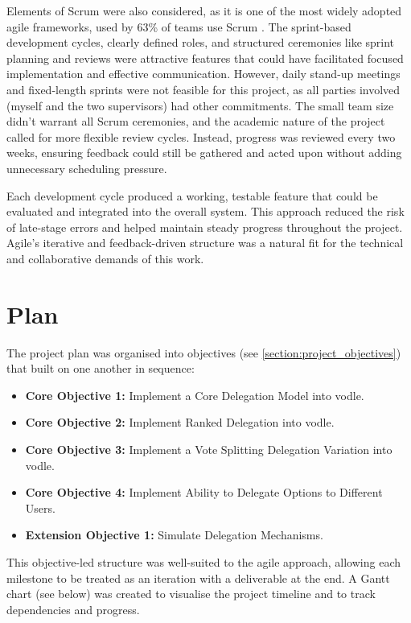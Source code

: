 Elements of Scrum were also considered, as it is one of the most widely adopted agile frameworks, used by 63\% of teams use Scrum \citep{versionone2020stateofagile}. The sprint-based development cycles, clearly defined roles, and structured ceremonies like sprint planning and reviews were attractive features that could have facilitated focused implementation and effective communication. However, daily stand-up meetings and fixed-length sprints were not feasible for this project, as all parties involved (myself and the two supervisors) had other commitments. The small team size didn't warrant all Scrum ceremonies, and the academic nature of the project called for more flexible review cycles. Instead, progress was reviewed every two weeks, ensuring feedback could still be gathered and acted upon without adding unnecessary scheduling pressure.

Each development cycle produced a working, testable feature that could be evaluated and integrated into the overall system. This approach reduced the risk of late-stage errors and helped maintain steady progress throughout the project. Agile's iterative and feedback-driven structure was a natural fit for the technical and collaborative demands of this work.
\section{Plan}

The project plan was organised into objectives (see \ref{section:project_objectives}) that built on one another in sequence:

\begin{itemize}
    \item \textbf{Core Objective 1:} Implement a Core Delegation Model into vodle.
    \item \textbf{Core Objective 2:} Implement Ranked Delegation into vodle.
    \item \textbf{Core Objective 3:} Implement a Vote Splitting Delegation Variation into vodle.
    \item \textbf{Core Objective 4:} Implement Ability to Delegate Options to Different Users.
    \item \textbf{Extension Objective 1:} Simulate Delegation Mechanisms.
\end{itemize}

This objective-led structure was well-suited to the agile approach, allowing each milestone to be treated as an iteration with a deliverable at the end. A Gantt chart (see below) was created to visualise the project timeline and to track dependencies and progress.

